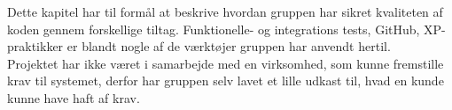 Dette kapitel har til formål at beskrive hvordan gruppen har sikret kvaliteten af koden gennem forskellige tiltag. 
Funktionelle- og integrations tests, GitHub, XP-praktikker er blandt nogle af de værktøjer gruppen har anvendt hertil. \\

Projektet har ikke været i samarbejde med en virksomhed, som kunne fremstille krav til systemet, 
derfor har gruppen selv lavet et lille udkast til, hvad en kunde kunne have haft af krav.
